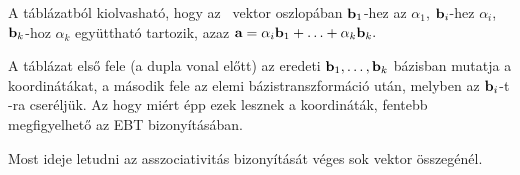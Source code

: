 \documentclass[a4paper,11.5pt]{article}
\begin{document}
	   A táblázatból kiolvasható, hogy az \a\ vektor oszlopában $\textbf{b}_1$-hez az $\alpha_1$, $\textbf{b}_i$-hez $\alpha_i$, $\textbf{b}_k$-hoz $\alpha_k$ együttható tartozik, azaz $\textbf{a}=\alpha_i\textbf{b}_1+\ldots+\alpha_k\textbf{b}_k.$
	
	   A táblázat első fele (a dupla vonal előtt) az eredeti $\textbf{b}_1,\ldots,\textbf{b}_k$ bázisban mutatja a koordinátákat, a második fele az elemi bázistranszformáció után, melyben az $\textbf{b}_i$-t \a-ra cseréljük. Az hogy miért épp ezek lesznek a koordináták, fentebb megfigyelhető az EBT bizonyításában.
	
	Most ideje letudni az asszociativitás bizonyítását véges sok vektor összegénél.
	
	
	
	
\end{document}
